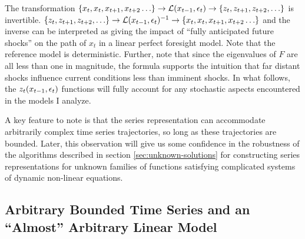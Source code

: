 \documentclass[12pt]{article}
\begin{document}
The
transformation $ {\{ x_{t}, x_{t}, x_{t+1},x_{t+2}\ldots\}} \rightarrow {\mathcal{L}}(x_{t-1},\epsilon_t) \rightarrow{\{ z_{t}, z_{t+1}, z_{t+2},\ldots\}} $ is invertible. $ {\{ z_{t}, z_{t+1}, z_{t+2},\ldots\}} \rightarrow {\mathcal{L}}(x_{t-1},\epsilon_t)^{-1} \rightarrow{\{ x_{t}, x_{t}, x_{t+1},x_{t+2}\ldots\}} $ and the inverse can be interpreted as giving the impact of ``fully anticipated future shocks'' on the path of $x_t$  in a linear perfect foresight model.  
Note that the reference model is deterministic.  
Further, note that since the eigenvalues of $F$ are all less than one in magnitude, the formula supports the intuition that far distant shocks
 influence current conditions less than  imminent shocks.
In what follows,
 the $z_t(x_{t-1},\epsilon_t)$ functions will 
fully account for any stochastic aspects encountered in the models I  analyze.

A key feature to note is that the series representation can accommodate arbitrarily complex time series trajectories, so long as these trajectories are bounded.
Later, this observation will give us some confidence in the 
robustness of the algorithms described in section 
\ref{sec:unknown-solutions} for constructing series 
representations for unknown families of functions 
satisfying complicated systems of dynamic non-linear equations.

\subsection{Arbitrary  Bounded Time Series and an ``Almost'' Arbitrary Linear Model }
\label{sec:almostarbitrary}
\end{document}

